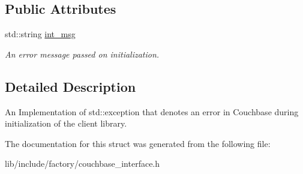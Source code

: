 \subsection*{Public Attributes}
\begin{DoxyCompactItemize}
\item 
\hypertarget{structCouchbaseInitException_ae1ed6a38393bfadd2531266ef4834670}{std\-::string \hyperlink{structCouchbaseInitException_ae1ed6a38393bfadd2531266ef4834670}{int\-\_\-msg}}\label{structCouchbaseInitException_ae1ed6a38393bfadd2531266ef4834670}

\begin{DoxyCompactList}\small\item\em An error message passed on initialization. \end{DoxyCompactList}\end{DoxyCompactItemize}


\subsection{Detailed Description}
An Implementation of std\-::exception that denotes an error in Couchbase during initialization of the client library. 

The documentation for this struct was generated from the following file\-:\begin{DoxyCompactItemize}
\item 
lib/include/factory/couchbase\-\_\-interface.\-h\end{DoxyCompactItemize}
